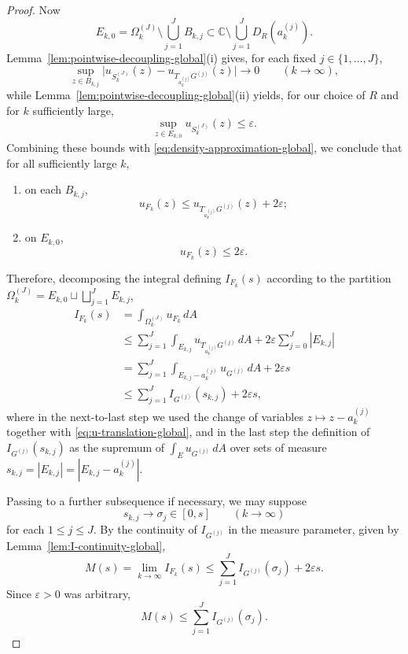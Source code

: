 \documentclass[a4paper,11pt,reqno]{amsart}
\numberwithin{equation}{section}
\theoremstyle{plain} %
\theoremstyle{definition} %
\theoremstyle{remark}
\newcommand{\C}{\mathbb{C}}
\begin{document}
\begin{proof}
Now
\[
E_{k,0}
=
\Omega_k^{(J)}\setminus \bigcup_{j=1}^J B_{k,j}
\subset
\C\setminus \bigcup_{j=1}^J D_R(a_k^{(j)}).
\]
Lemma~\ref{lem:pointwise-decoupling-global}(i) gives, for each fixed
\(j\in\{1,\dots,J\}\),
\[
\sup_{z\in B_{k,j}}
\big|u_{S_k^{(J)}}(z)-u_{T_{a_k^{(j)}}G^{(j)}}(z)\big|\to 0
\qquad (k\to\infty),
\]
while Lemma~\ref{lem:pointwise-decoupling-global}(ii) yields, for our
choice of \(R\) and for \(k\) sufficiently large,
\[
\sup_{z\in E_{k,0}}u_{S_k^{(J)}}(z)\le \varepsilon.
\]
Combining these bounds with \eqref{eq:density-approximation-global}, we
conclude that for all sufficiently large \(k\),
\begin{enumerate}
\item[(a)] on each \(B_{k,j}\),
\[
u_{F_k}(z)\le u_{T_{a_k^{(j)}}G^{(j)}}(z)+2\varepsilon;
\]
\item[(b)] on \(E_{k,0}\),
\[
u_{F_k}(z)\le 2\varepsilon.
\]
\end{enumerate}

Therefore, decomposing the integral defining \(I_{F_k}(s)\) according to the
partition \(\Omega_k^{(J)}=E_{k,0}\sqcup\bigsqcup_{j=1}^J E_{k,j}\),
\begin{align*}
I_{F_k}(s)
&=
\int_{\Omega_k^{(J)}} u_{F_k}\,dA \\
&\le
\sum_{j=1}^J \int_{E_{k,j}} u_{T_{a_k^{(j)}}G^{(j)}}\,dA
+2\varepsilon \sum_{j=0}^J |E_{k,j}| \\
&=
\sum_{j=1}^J \int_{E_{k,j}-a_k^{(j)}} u_{G^{(j)}}\,dA
+2\varepsilon s \\
&\le
\sum_{j=1}^J I_{G^{(j)}}(s_{k,j})
+2\varepsilon s,
\end{align*}
where in the next-to-last step we used the change of variables
\(z\mapsto z-a_k^{(j)}\) together with \eqref{eq:u-translation-global}, and
in the last step the definition of \(I_{G^{(j)}}(s_{k,j})\) as the supremum
of \(\int_E u_{G^{(j)}}\,dA\) over sets of measure
\(s_{k,j}=|E_{k,j}|=|E_{k,j}-a_k^{(j)}|\).

Passing to a further subsequence if necessary, we may suppose
\[
s_{k,j}\to \sigma_j\in [0,s]
\qquad (k\to\infty)
\]
for each \(1\le j\le J\). By the continuity of \(I_{G^{(j)}}\) in the
measure parameter, given by Lemma~\ref{lem:I-continuity-global},
\[
M(s)=\lim_{k\to\infty}I_{F_k}(s)
\le
\sum_{j=1}^J I_{G^{(j)}}(\sigma_j)+2\varepsilon s.
\]
Since \(\varepsilon>0\) was arbitrary,
\begin{equation}\label{eq:M-upper-profiles-global}
M(s)\le \sum_{j=1}^J I_{G^{(j)}}(\sigma_j).
\end{equation}


\end{proof}
\end{document}
